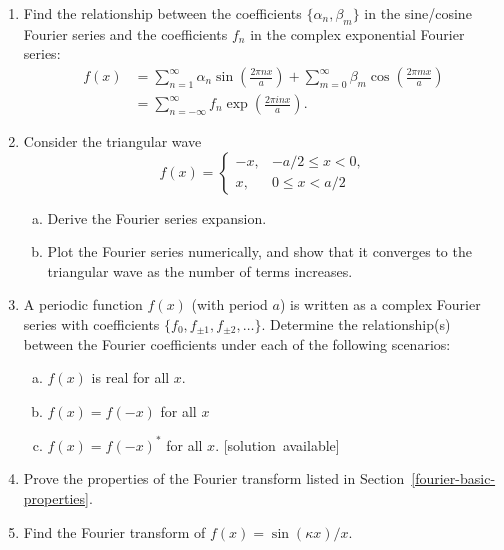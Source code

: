 \documentclass[10pt,a4paper]{article}
\begin{document}
\begin{enumerate}
\item
  Find the relationship between the coefficients
  $\{\alpha_n, \beta_m\}$ in the sine/cosine Fourier series and the
  coefficients $f_n$ in the complex exponential Fourier
  series:
  \begin{align}
    f(x) &= \sum_{n=1}^\infty \alpha_n \sin\left(\frac{2\pi n x}{a}\right) + \sum_{m=0}^\infty \beta_m \cos\left(\frac{2 \pi m x}{a}\right) \\
    &= \sum_{n=-\infty}^\infty f_n \exp\left(\frac{2\pi i n x}{a}\right).
  \end{align}

\item
  Consider the triangular wave
  \begin{equation}
    f(x) = \left\{\begin{array}{rr}- x, &-a/2 \le x < 0, \\
    x, & 0 \le x < a/2\end{array}\right.
  \end{equation}

  \begin{enumerate}[(a)]
  \item
    Derive the Fourier series expansion.

  \item
    Plot the Fourier series numerically, and show that it converges to
    the triangular wave as the number of terms increases.
  \end{enumerate}

\item
  A periodic function $f(x)$ (with period $a$) is written as a complex
  Fourier series with coefficients $\{f_0, f_{\pm1}, f_{\pm2},
  \dots\}$. Determine the relationship(s) between the Fourier
  coefficients under each of the following scenarios:
  \begin{enumerate}[(a)]
  \item $f(x)$ is real for all $x$.
  \item $f(x) = f(-x)$ for all $x$
  \item $f(x) = f(-x)^*$ for all $x$.
  \hfill{\scriptsize [solution~available]}
  \end{enumerate}

\item
  Prove the properties of the Fourier transform listed in
  Section~\ref{fourier-basic-properties}.

\item
  Find the Fourier transform of $f(x) = \sin(\kappa x)/x.$


\end{enumerate}
\end{document}
